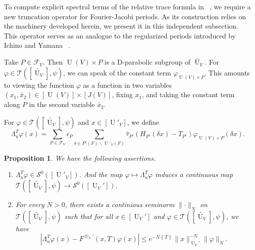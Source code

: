\documentclass[letterpaper,11pt]{amsart}
\newcommand{\cF}{\mathcal{F}}
\newcommand{\cS}{\mathcal{S}}
\newcommand{\cT}{\mathcal{T}}
\newcommand{\<}{\negthickspace}
\providecommand{\aabs}[1]{\lVert#1\rVert}
\DeclareMathOperator{\U}{U}
\theoremstyle{definition}
\theoremstyle{plain}
\newtheorem{prop}[definition]{Proposition}
\theoremstyle{remark}
\numberwithin{equation}{section}
\begin{document}
To compute explicit spectral terms of the relative trace formula in ~\cite{BLX3}, we require a new truncation operator for Fourier-Jacobi periods. As its construction relies on the machinery developed herein, we present it in this independent subsection. This operator serves as an analogue to the regularized periods introduced by Ichino and Yamana ~\cite{IY2}.

Take $P \in \cF_V$. Then $\U(V) \times P$ is a D-parabolic subgroup of
$\widetilde{\U_V}$. For $\varphi \in
\cT([\widetilde{\U_V}], \psi)$, we can speak of the constant term
$\varphi_{\U(V) \times P}$. This amounts to viewing the function
$\varphi$ as a function in two variables $(x_1, \widetilde{x_2})
\in [\U(V)] \times [J(V)]$, fixing
$x_1$, and taking the constant term along $P$ in the second variable
$\widetilde{x_2}$.

For $\varphi \in \cT([\widetilde{\U_V}], \psi)$ and $x \in [\U'_V]$, we
define
\begin{equation}
\label{eq:unitary_truncation}
     \Lambda^T_u \varphi(x) =
    \sum_{P \in \cF_V} \epsilon_P
    \sum_{\delta \in P'(F) \backslash \U'_V(F)}
    \widehat{\tau}_{P'}(H_{P'}(\delta x)-T_{P'})
    \varphi_{\U(V) \times P}(\delta x).
\end{equation}


\begin{prop}    \label{prop:IY_properties}
We have the following assertions.
\begin{enumerate}
    \item $\Lambda_u^T \varphi \in \cS^0([\U'_V])$. And the map $\varphi
        \mapsto \Lambda_u^T \varphi$ induces a continuous map
        $\cT([\widetilde{\U_V}],\psi) \to \cS^0([\U_V'])$.

    \item For every $N>0$, there exists a continious seminorm $\aabs{\cdot}_N$ on
        $\cT([\widetilde{\U_V}],\psi)$ such that for all $x \in [\U_V']$ and
        $\varphi \in \cT([\widetilde{\U_V}],\psi)$, we have
            \[
            \left| \Lambda^T_u \varphi(x)-F^{\U_V'}(x,T)\varphi(x) \right|
            \le e^{-N\|T\|} \|x\|_{\U_V'}^{-N} \aabs{\varphi}_N.
            \]
\end{enumerate}
\end{prop}
\end{document}
